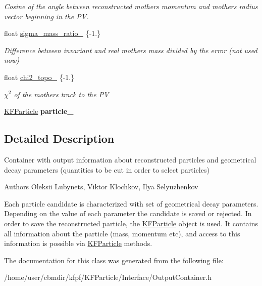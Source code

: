 \begin{DoxyCompactItemize}
\begin{DoxyCompactList}\small\item\em Cosine of the angle between reconstructed mother\textquotesingle{}s momentum and mother\textquotesingle{}s radius vector beginning in the PV. \end{DoxyCompactList}\item 
float \hyperlink{classOutputContainer_afc1805a303c017ada1732f968f81cc73}{sigma\+\_\+mass\+\_\+ratio\+\_\+} \{-\/1.\}\hypertarget{classOutputContainer_afc1805a303c017ada1732f968f81cc73}{}\label{classOutputContainer_afc1805a303c017ada1732f968f81cc73}

\begin{DoxyCompactList}\small\item\em Difference between invariant and real mother\textquotesingle{}s mass divided by the error (not used now) \end{DoxyCompactList}\item 
float \hyperlink{classOutputContainer_a6e63c6cb3fc549d988e1f62940cc467c}{chi2\+\_\+topo\+\_\+} \{-\/1.\}\hypertarget{classOutputContainer_a6e63c6cb3fc549d988e1f62940cc467c}{}\label{classOutputContainer_a6e63c6cb3fc549d988e1f62940cc467c}

\begin{DoxyCompactList}\small\item\em $\chi^2$ of the mother\textquotesingle{}s track to the PV \end{DoxyCompactList}\item 
\hyperlink{classKFParticle}{K\+F\+Particle} {\bfseries particle\+\_\+}\hypertarget{classOutputContainer_acbde4c7ae583ef6e2c244ae298efb797}{}\label{classOutputContainer_acbde4c7ae583ef6e2c244ae298efb797}

\end{DoxyCompactItemize}


\subsection{Detailed Description}
Container with output information about reconstructed particles and geometrical decay parameters (quantities to be cut in order to select particles) 

\begin{DoxyAuthor}{Authors}
Oleksii Lubynets, Viktor Klochkov, Ilya Selyuzhenkov
\end{DoxyAuthor}
Each particle candidate is characterized with set of geometrical decay parameters. Depending on the value of each parameter the candidate is saved or rejected. In order to save the reconstructed particle, the \hyperlink{classKFParticle}{K\+F\+Particle} object is used. It contains all information about the particle (mass, momentum etc), and access to this information is possible via \hyperlink{classKFParticle}{K\+F\+Particle} methods. 

The documentation for this class was generated from the following file\+:\begin{DoxyCompactItemize}
\item 
/home/user/cbmdir/kfpf/\+K\+F\+Particle/\+Interface/Output\+Container.\+h\end{DoxyCompactItemize}
